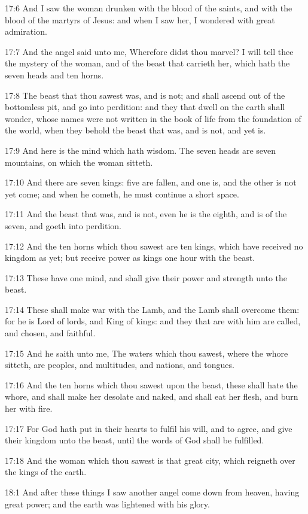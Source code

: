 17:6 And I saw the woman drunken with the blood of the saints, and
with the blood of the martyrs of Jesus: and when I saw her, I wondered
with great admiration.

17:7 And the angel said unto me, Wherefore didst thou marvel? I will
tell thee the mystery of the woman, and of the beast that carrieth
her, which hath the seven heads and ten horns.

17:8 The beast that thou sawest was, and is not; and shall ascend out
of the bottomless pit, and go into perdition: and they that dwell on
the earth shall wonder, whose names were not written in the book of
life from the foundation of the world, when they behold the beast that
was, and is not, and yet is.

17:9 And here is the mind which hath wisdom. The seven heads are seven
mountains, on which the woman sitteth.

17:10 And there are seven kings: five are fallen, and one is, and the
other is not yet come; and when he cometh, he must continue a short
space.

17:11 And the beast that was, and is not, even he is the eighth, and
is of the seven, and goeth into perdition.

17:12 And the ten horns which thou sawest are ten kings, which have
received no kingdom as yet; but receive power as kings one hour with
the beast.

17:13 These have one mind, and shall give their power and strength
unto the beast.

17:14 These shall make war with the Lamb, and the Lamb shall overcome
them: for he is Lord of lords, and King of kings: and they that are
with him are called, and chosen, and faithful.

17:15 And he saith unto me, The waters which thou sawest, where the
whore sitteth, are peoples, and multitudes, and nations, and tongues.

17:16 And the ten horns which thou sawest upon the beast, these shall
hate the whore, and shall make her desolate and naked, and shall eat
her flesh, and burn her with fire.

17:17 For God hath put in their hearts to fulfil his will, and to
agree, and give their kingdom unto the beast, until the words of God
shall be fulfilled.

17:18 And the woman which thou sawest is that great city, which
reigneth over the kings of the earth.

18:1 And after these things I saw another angel come down from heaven,
having great power; and the earth was lightened with his glory.


